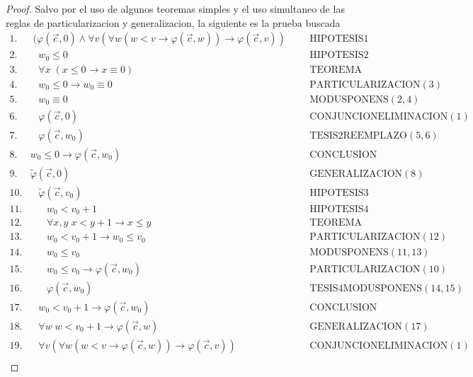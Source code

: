 \begin{proof}
    Salvo por el uso de algunos teoremas simples y el uso simultaneo de las reglas de particularizacion y generalizacion,
    la siguiente es la prueba buscada
    \[
      \begin{array}{lllll}
        1. & \; (\varphi (\vec{c},0) \wedge \forall v(\forall w(w< v\rightarrow \varphi (\vec{c},w))\rightarrow \varphi (\vec{c},v)) &&& \text{HIPOTESIS}1 \\
        2. & \;\;\;w_{0}\leq 0 &&& \text{HIPOTESIS}2 \\
        3. & \;\;\;\forall x\;(x\leq 0\rightarrow x\equiv 0) &&& \text{TEOREMA} \\
        4. & \;\;\;w_{0}\leq 0\rightarrow w_{0}\equiv 0 &&& \text{PARTICULARIZACION}(3) \\
        5. & \;\;\;w_{0}\equiv 0 &&& \text{MODUSPONENS}(2,4) \\
        6. & \;\;\;\varphi (\vec{c},0) &&& \text{CONJUNCIONELIMINACION}(1) \\
        7. & \;\;\;\varphi (\vec{c},w_{0}) &&& \text{TESIS}2\text{REEMPLAZO} (5,6) \\
        8. & w_{0}\leq 0\rightarrow \varphi (\vec{c},w_{0}) &&& \text{CONCLUSION} \\
        9. & \tilde{\varphi}(\vec{c},0) &&& \text{GENERALIZACION}(8) \\
        10. & \;\;\;\tilde{\varphi}(\vec{c},v_{0}) &&& \text{HIPOTESIS}3 \\
        11. & \;\;\;\;\;\;w_{0}< v_{0}+1 &&& \text{HIPOTESIS}4 \\
        12. & \;\;\;\;\;\;\forall x,y\;x< y+1\rightarrow x\leq y &&& \text{TEOREMA } \\
        13. & \;\;\;\;\;\;w_{0}< v_{0}+1\rightarrow w_{0}\leq v_{0} &&& \text{PARTICULARIZACION}(12) \\
        14. & \;\;\;\;\;\;w_{0}\leq v_{0} &&& \text{MODUSPONENS}(11,13) \\
        15. & \;\;\;\;\;\;w_{0}\leq v_{0}\rightarrow \varphi (\vec{c},w_{0}) &&& \text{PARTICULARIZACION}(10) \\
        16. & \;\;\;\;\;\;\varphi (\vec{c},w_{0}) &&& \text{TESIS}4\text{MODUSPONENS}(14,15) \\
        17. & \;\;\;w_{0}< v_{0}+1\rightarrow \varphi (\vec{c},w_{0}) &&& \text{CONCLUSION} \\
        18. & \;\;\;\forall w\;w< v_{0}+1\rightarrow \varphi (\vec{c},w) &&& \text{GENERALIZACION}(17) \\
        19. & \;\;\;\forall v(\forall w(w< v\rightarrow \varphi (\vec{c} ,w))\rightarrow \varphi (\vec{c},v)) &&& \text{CONJUNCIONELIMINACION}(1) \\

\end{array}\]
\end{proof}
